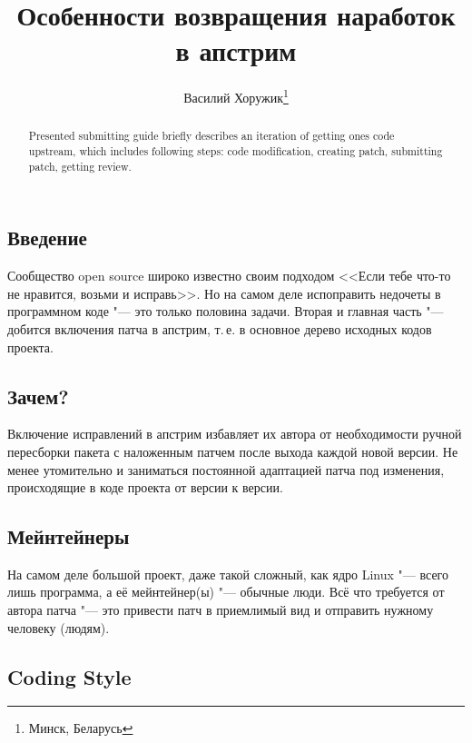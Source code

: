 \documentclass[10pt, a5paper]{article}
\begin{document}
\title{Особенности возвращения наработок в апстрим}%

\author{Василий Хоружик\footnote{Минск, Беларусь}}
\maketitle

\begin{abstract}
Presented submitting guide briefly describes an iteration of getting ones code upstream, which includes following steps: code modification, creating patch, submitting patch, getting review.
\end{abstract}

\subsection*{Введение}

Сообщество open source широко известно своим подходом <<Если тебе что-то не нравится, возьми и исправь>>. Но на самом деле испоправить недочеты в программном коде "--- это только половина задачи. Вторая и главная часть "--- добится включения патча в апстрим, т.\,е. в основное дерево исходных кодов проекта.

\subsection*{Зачем?}

Включение исправлений в апстрим избавляет их автора от необходимости ручной пересборки пакета с наложенным патчем после выхода каждой новой версии. Не менее утомительно и заниматься постоянной адаптацией патча под изменения, происходящие в коде проекта от версии к версии.

\subsection*{Мейнтейнеры}

На самом деле большой проект, даже такой сложный, как ядро Linux "--- всего лишь программа, а её мейнтейнер(ы) "--- обычные люди. Всё что требуется от автора патча "--- это привести патч в приемлимый вид и отправить нужному человеку (людям).

\subsection*{Coding Style}
\end{document}
